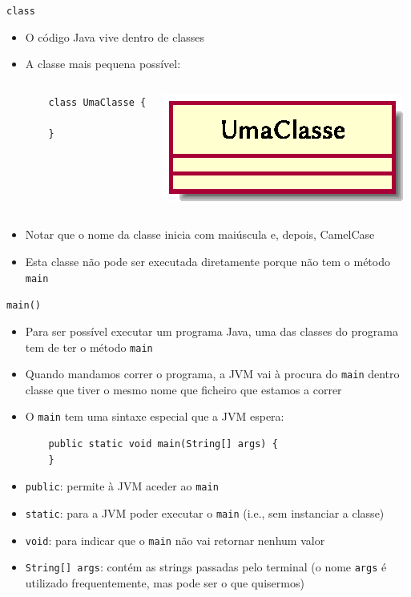 \documentclass[portuguese, aspectratio=169, xcolor=table]{beamer}
\begin{document}
\begin{frame}[fragile]{\texttt{class}}
\begin{itemize}
    \item O código Java vive dentro de classes
    \item A classe mais pequena possível:
\begin{columns}
    \begin{verbatim}
    class UmaClasse {

    }
\end{verbatim}
\begin{center}
\includegraphics[scale=1]{./uml_diagrams/class0}
\end{center}
\end{columns}
\vspace{0.25cm}
\item Notar que o nome da classe inicia com maiúscula e, depois, CamelCase
\item Esta classe não pode ser executada diretamente porque não tem o método \texttt{main}
\end{itemize}
\end{frame}


\begin{frame}[fragile]{\texttt{main()}}
    \begin{itemize}
        \item Para ser possível executar um programa Java, uma das classes do programa tem de ter o método \texttt{main}
        \item Quando mandamos correr o programa, a JVM vai à procura do \texttt{main} dentro classe que tiver o mesmo nome que ficheiro  que estamos a correr
        \item O \texttt{main} tem uma sintaxe especial que a JVM espera:
\begin{verbatim}
    public static void main(String[] args) {
    }
\end{verbatim}
    \end{itemize}
\begin{itemize}
\item \texttt{public}: permite à JVM aceder ao \texttt{main}
\item \texttt{static}: para a JVM poder executar o \texttt{main} (i.e., sem instanciar a classe)
\item \texttt{void}: para indicar que o \texttt{main} não vai retornar nenhum valor
\item \texttt{String[] args}: contém as strings passadas pelo terminal (o nome \texttt{args} é utilizado frequentemente, mas pode ser o que quisermos)
\end{itemize}
\end{frame}
\end{document}
